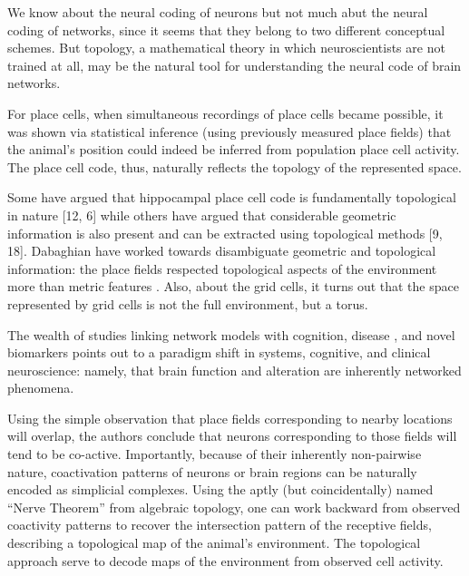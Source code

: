 \documentclass[onecollarge,runningheads]{svjour2}
\begin{document}
We know about the neural coding of neurons but not much abut the neural coding of networks, since it seems that they belong to two different conceptual schemes. But topology, a mathematical theory in which neuroscientists are not trained at all, may be the natural tool for understanding the neural code of brain networks.

For place cells, when simultaneous recordings of place cells became possible, it was shown via statistical inference (using previously measured place fields) that the animal's position could indeed be inferred from population place cell activity. The place cell code, thus, naturally reflects the topology of the represented space.

\cite{curto2016can} Some have argued that hippocampal place cell code is fundamentally topological in nature [12, 6] while others have argued that considerable geometric information is also present and can be extracted using topological methods [9, 18]. Dabaghian have worked towards disambiguate geometric and topological information: the place fields respected topological aspects of the environment more than metric features \cite{dabaghian2014reconceiving}. Also, about the grid cells, it turns out that the space represented by grid cells is not the full environment, but a torus.

The wealth of studies linking network models with cognition, disease \cite{stefan2013epileptic}, \cite{stam2014modern} and novel biomarkers points out to a paradigm shift in systems, cognitive, and clinical neuroscience: namely, that brain function and alteration are inherently networked phenomena.


Using the simple observation that place fields corresponding to nearby locations will overlap, the authors conclude that neurons corresponding to those fields will tend to be co-active. Importantly, because of their inherently non-pairwise nature, coactivation patterns of neurons or brain regions can be naturally encoded as simplicial complexes. 
Using the aptly (but coincidentally) named “Nerve Theorem” from algebraic topology, one can work backward from observed coactivity patterns to recover the intersection pattern of the receptive fields, describing a topological map of the animal’s environment.
The topological approach serve to decode maps of the environment from observed cell activity.
\end{document}
